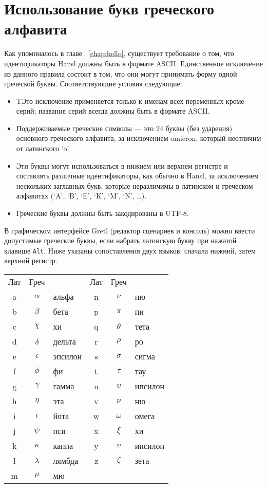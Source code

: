 \chapter{Использование букв греческого алфавита}
\label{chap:greeks}

Как упоминалось в главе ~\ref{chap:hello}, существует требование о
том, что идентификаторы Hansl должны быть в формате
ASCII. Единственное исключение из данного правила состоит в том, что
они могут принимать форму одной греческой буквы. Соответствующие
условия следующие:

\begin{itemize}
\item TЭто исключение применяется только к именам всех переменных
  кроме серий; названия серий всегда должны быть в формате ASCII.
\item Поддерживаемые греческие символы --- это 24 буквы (без ударения)
  основного греческого алфавита, за исключением omicron, который
  неотличим от латинского ‘o’.
\item Эти буквы могут использоваться в нижнем или верхнем регистре и
  составлять различные идентификаторы, как обычно в Hansl, за
  исключением нескольких заглавных букв, которые неразличимы в
  латинском и греческом алфавитах (`A', `B', `E', `K', `M', `N',
  \dots).
\item Греческие буквы должны быть закодированы в UTF-8.
\end{itemize}

В графическом интерфейсе Gretl (редактор сценариев и консоль) можно
ввести допустимые греческие буквы, если набрать латинскую букву при
нажатой клавише \texttt{Alt}. Ниже указаны сопоставления двух языков:
сначала нижний, затем верхний регистр.

\begin{center}
  \begin{tabular}{ccl@{\hskip 4em}ccl}
    Лат & Греч & & Лат & Греч \\[4pt]
    a & $\alpha$ & альфа & n & $\nu$ & ню \\
    b & $\beta$ & бета & p & $\pi$ & пи \\
    c & $\chi$ & хи & q & $\theta$ & тета \\
    d & $\delta$ & дельта & r & $\rho$ & ро \\
    e & $\epsilon$ & эпсилон & s & $\sigma$ & сигма \\
    f & $\phi$ & фи & t & $\tau$ & тау \\
    g & $\gamma$ & гамма & u & $\upsilon$ & ипсилон \\
    h & $\eta$ & эта & v & $\nu$ & ню \\
    i & $\iota$ & йота & w & $\omega$ & омега \\
    j & $\psi$ & пси & x & $\xi$ & хи \\
    k & $\kappa$ & каппа & y & $\upsilon$ & ипсилон \\
    l & $\lambda$ & лямбда & z & $\zeta$ & зета \\
    m & $\mu$ & мю \\
  \end{tabular}
\end{center}

